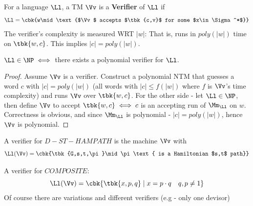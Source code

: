 \begin{yellowBox}
	\begin{defn}[Verifier]
		For a language $\Ll$, a TM $\Vv$ is a \textbf{Verifier} of $\Ll$ if\[
		\Ll = \cbk{w\mid \text{$\Vv$ accepts $\tbk{c,v}$ for some $x\in \Sigma^*$}}
		\]
		The verifier's complexity is measured WRT $|w|$: That is, runs in $poly(|w|)$ time on $\tbk{w,c}$. This implies $|c| = poly(|w|)$.
	\end{defn}
\end{yellowBox}
\begin{blueBox}
	\begin{thm}
		$\Ll\in \NP \iff$ there exists a polynomial verifier for $\Ll$.
	\end{thm}
\end{blueBox}
\begin{proof}
	Assume $\Vv$ is a verifier. Construct a polynomial NTM that guesses a word $c$ with $|c| = poly(|w|)$ (all words with $|c| \leq f(|w|)$ where $f$ is $\Vv$'s time complexity) and runs $\Vv$ over $\tbk{w,c}$. For the other side - let $\Ll\in \NP$, then define $\Vv$ to accept $\tbk{w,c}\iff c$ is an accepting run of $\Mm_\Ll$ on $w$. Correctness is obvious, and since $\Mm_\Ll$ is polynomial - $|c| = poly(|w|)$, hence $\Vv$ is polynomial.
\end{proof}
\begin{example}
	A verifier for $D-ST-HAMPATH$ is the machine $\Vv$ with 
	\[
	\Ll(\Vv) = \cbk{\tbk{G,s,t,\pi}\mid \pi\text{ is a Hamiltonian $s,t$ path}}
	\]
\end{example}
\begin{example}
	A verifier for $COMPOSITE$:\[
	\Ll(\Vv) = \cbk{\tbk{x,p,q}\mid x = p\cdot q\quad q,p\neq 1}
	\]
	Of course there are variations and different verifiers (e.g - only one devisor)
\end{example}
